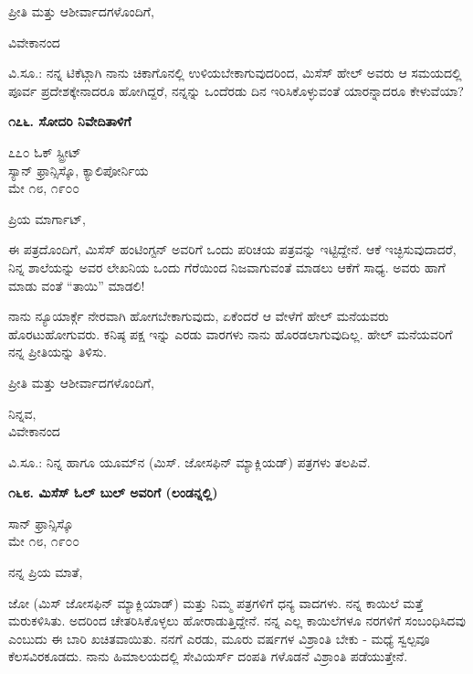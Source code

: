 ಪ್ರೀತಿ ಮತ್ತು ಆಶೀರ್ವಾದಗಳೊಂದಿಗೆ,

\begin{flushright}
ವಿವೇಕಾನಂದ
\end{flushright}

ವಿ.ಸೂ.: ನನ್ನ ಟಿಕೆಟ್ಗಾಗಿ ನಾನು ಚಿಕಾಗೊನಲ್ಲಿ ಉಳಿಯಬೇಕಾಗುವುದರಿಂದ, ಮಿಸೆಸ್ ಹೇಲ್ ಅವರು ಆ ಸಮಯದಲ್ಲಿ ಪೂರ್ವ ಪ್ರದೇಶಕ್ಕೇನಾದರೂ ಹೋಗಿದ್ದರೆ, ನನ್ನನ್ನು ಒಂದೆರಡು ದಿನ ಇರಿಸಿಕೊಳ್ಳುವಂತೆ ಯಾರನ್ನಾದರೂ ಕೇಳುವೆಯಾ?

\begin{center}
\textbf{೧೭೬. ಸೋದರಿ ನಿವೇದಿತಾಳಿಗೆ}
\end{center}

\begin{flushright}
೭೭೦ ಓಕ್ ಸ್ಟ್ರೀಟ್\\ಸ್ಯಾನ್ ಫ್ರಾನ್ಸಿಸ್ಕೊ, ಕ್ಯಾಲಿಪೋರ್ನಿಯ\\ಮೇ ೧೮, ೧೯೦೦
\end{flushright}

ಪ್ರಿಯ ಮಾರ್ಗಾಟ್,

ಈ ಪತ್ರದೊಂದಿಗೆ, ಮಿಸೆಸ್ ಹಂಟಿಂಗ್ಟನ್ ಅವರಿಗೆ ಒಂದು ಪರಿಚಯ ಪತ್ರವನ್ನು ಇಟ್ಟಿದ್ದೇನೆ. ಆಕೆ ಇಚ್ಛಿಸುವುದಾದರೆ, ನಿನ್ನ ಶಾಲೆಯನ್ನು ಅವರ ಲೇಖನಿಯ ಒಂದು ಗೆರೆಯಿಂದ ನಿಜವಾಗುವಂತೆ ಮಾಡಲು ಆಕೆಗೆ ಸಾಧ್ಯ. ಅವರು ಹಾಗೆ ಮಾಡು ವಂತೆ “ತಾಯಿ” ಮಾಡಲಿ!

ನಾನು ನ್ಯೂಯಾರ್ಕ್ಗೆ ನೇರವಾಗಿ ಹೋಗಬೇಕಾಗುವುದು, ಏಕೆಂದರೆ ಆ ವೇಳೆಗೆ ಹೇಲ್ ಮನೆಯವರು ಹೊರಟುಹೋಗುವರು. ಕನಿಷ್ಠ ಪಕ್ಷ ಇನ್ನು ಎರಡು ವಾರಗಳು ನಾನು ಹೊರಡಲಾಗುವುದಿಲ್ಲ. ಹೇಲ್ ಮನೆಯವರಿಗೆ ನನ್ನ ಪ್ರೀತಿಯನ್ನು ತಿಳಿಸು.

ಪ್ರೀತಿ ಮತ್ತು ಆಶೀರ್ವಾದಗಳೊಂದಿಗೆ,

\begin{flushright}
ನಿನ್ನವ,\\ವಿವೇಕಾನಂದ
\end{flushright}

ವಿ.ಸೂ.: ನಿನ್ನ ಹಾಗೂ ಯೂಮ್​ನ (ಮಿಸ್. ಜೋಸಫಿನ್ ಮ್ಯಾಕ್ಲಿಯಡ್) ಪತ್ರಗಳು ತಲಪಿವೆ.

\begin{center}
\textbf{೧೬೮. ಮಿಸೆಸ್ ಓಲ್ ಬುಲ್ ಅವರಿಗೆ (ಲಂಡನ್ನಲ್ಲಿ)}
\end{center}

\begin{flushright}
ಸಾನ್ ಫ್ರಾನ್ಸಿಸ್ಕೊ\\ಮೇ ೧೮, ೧೯೦೦
\end{flushright}

ನನ್ನ ಪ್ರಿಯ ಮಾತೆ,

ಜೋ (ಮಿಸ್ ಜೋಸಫಿನ್ ಮ್ಯಾಕ್ಲಿಯಾಡ್) ಮತ್ತು ನಿಮ್ಮ ಪತ್ರಗಳಿಗೆ ಧನ್ಯ ವಾದಗಳು. ನನ್ನ ಕಾಯಿಲೆ ಮತ್ತೆ ಮರುಕಳಿಸಿತು. ಅದರಿಂದ ಚೇತರಿಸಿಕೊಳ್ಳಲು ಹೋರಾಡುತ್ತಿದ್ದೇನೆ. ನನ್ನ ಎಲ್ಲ ಕಾಯಿಲೆಗಳೂ ನರಗಳಿಗೆ ಸಂಬಂಧಿಸಿದವು ಎಂಬುದು ಈ ಬಾರಿ ಖಚಿತವಾಯಿತು. ನನಗೆ ಎರಡು, ಮೂರು ವರ್ಷಗಳ ವಿಶ್ರಾಂತಿ ಬೇಕು - ಮಧ್ಯೆ ಸ್ವಲ್ಪವೂ ಕೆಲಸವಿರಕೂಡದು. ನಾನು ಹಿಮಾಲಯದಲ್ಲಿ ಸೇವಿಯರ್ಸ್ ದಂಪತಿ ಗಳೊಡನೆ ವಿಶ್ರಾಂತಿ ಪಡೆಯುತ್ತೇನೆ.


